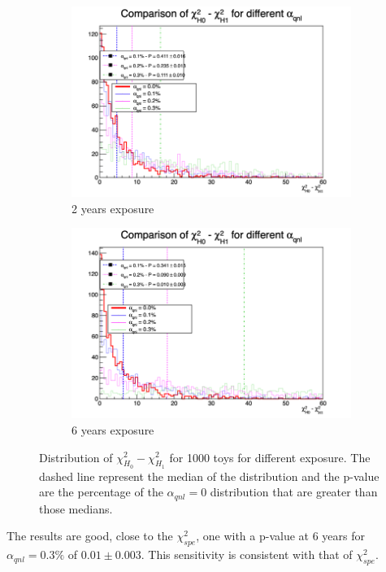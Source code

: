 \documentclass[../main.tex]{subfiles}
\begin{document}
\begin{figure}[th]
  \begin{subfigure}[t]{0.48\linewidth}
    \includegraphics[width=\linewidth]{images/joint_fit/stat_tests/chi2_H_2y.png}
    \caption{2 years exposure}
  \end{subfigure}
  \begin{subfigure}[t]{0.48\linewidth}
    \includegraphics[width=\linewidth]{images/joint_fit/stat_tests/chi2_H_6y.png}
    \caption{6 years exposure}
  \end{subfigure}
  \caption{Distribution of $\chi^2_{H_0} - \chi^2_{H_1}$ for 1000 toys for different exposure. The dashed line represent the median of the distribution and the p-value are the percentage of the $\alpha_{qnl} = 0$ distribution that are greater than those medians.}
  \label{fig:joint_fit:chi2_H}
\end{figure}

The results are good, close to the $\chi^2_{spe}$, one with a p-value at 6 years for $\alpha_{qnl} = 0.3\%$ of $0.01 \pm 0.003$. This sensitivity is consistent with that of $\chi^2_{spe}$.
\end{document}
